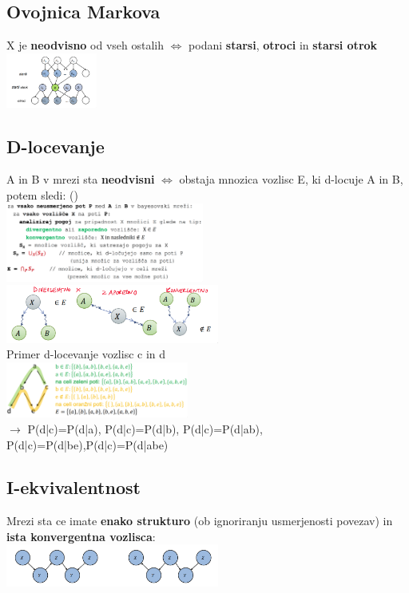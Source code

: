 \subsection{Ovojnica Markova}
X je \textbf{neodvisno} od vseh ostalih $\Leftrightarrow$ podani \textbf{starsi}, \textbf{otroci} in \textbf{starsi otrok}\\
\includegraphics[width=3cm]{images/ovojnica-markova.png}
\subsection{D-locevanje}
A in B v mrezi sta \textbf{neodvisni} $\Leftrightarrow$ obstaja mnozica vozlisc E, ki d-locuje A in B, potem sledi:  ()\\
\includegraphics[width=6.5cm]{images/d-locevanje-algoritem.png}
\includegraphics*[width=7cm]{images/d-locevanje-nacini.png}
\\
Primer d-locevanje vozlisc c in d\\
\includegraphics*[width=6cm]{images/primer-d-locevanje.png}\\
$\rightarrow$ P(d|c)=P(d|a), P(d|c)=P(d|b), P(d|c)=P(d|ab),\\
P(d|c)=P(d|be),P(d|c)=P(d|abe)
\subsection{I-ekvivalentnost}
Mrezi sta  ce imate \textbf{enako strukturo} (ob ignoriranju usmerjenosti povezav) in \textbf{ista konvergentna vozlisca}:\\
\includegraphics*[width=7cm]{./images/i-ekvivalentnost.png}